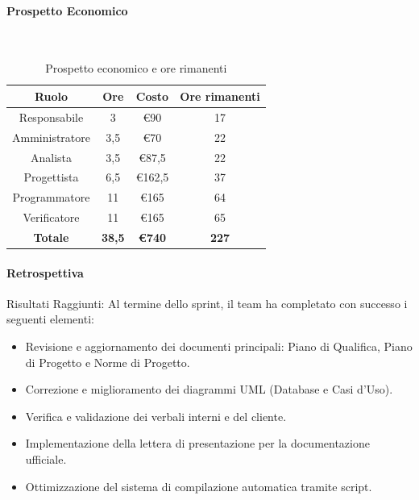 \documentclass{article}
\begin{document}
                \paragraph{Prospetto Economico}\mbox{}\\
                \begin{table}[H]
                    \centering
                    \begin{tabular}{|c|c|c|c|}
                    \hline
                    \textbf{Ruolo}  & \textbf{Ore}  & \textbf{Costo} & \textbf{Ore rimanenti} \\ \hline
                    Responsabile    & 3             & €90            & 17                     \\ \hline
                    Amministratore  & 3,5           & €70            & 22                   \\ \hline
                    Analista        & 3,5           & €87,5          & 22                   \\ \hline
                    Progettista     & 6,5           & €162,5         & 37                   \\ \hline
                    Programmatore   & 11            & €165           & 64                     \\ \hline
                    Verificatore    & 11            & €165           & 65                     \\ \hline
                    \textbf{Totale} & \textbf{38,5} & \textbf{\euro740}   & \textbf{227}         \\ \hline
                    \end{tabular}
                    \caption{Prospetto economico e ore rimanenti}
                \end{table}

                \paragraph{Retrospettiva}
                Risultati Raggiunti:
                Al termine dello sprint, il team ha completato con successo i seguenti elementi:
                \begin{itemize}
                    \item Revisione e aggiornamento dei documenti principali: Piano di Qualifica, Piano di Progetto e Norme di Progetto.
                    \item Correzione e miglioramento dei diagrammi UML (Database e Casi d'Uso).
                    \item Verifica e validazione dei verbali interni e del cliente.
                    \item Implementazione della lettera di presentazione per la documentazione ufficiale.
                    \item Ottimizzazione del sistema di compilazione automatica tramite script.
                \end{itemize}
                
\end{document}
